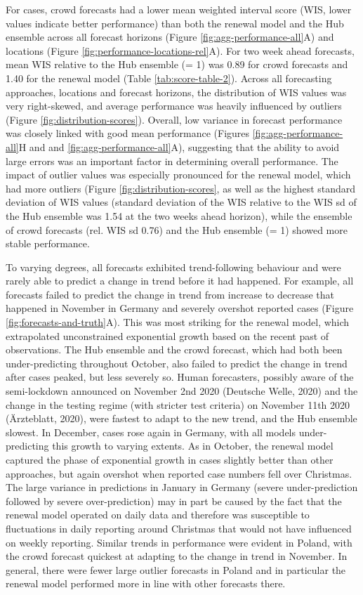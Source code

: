 \documentclass[
]{article}
\begin{document}
For cases, crowd forecasts had a lower mean weighted interval score (WIS, lower values indicate better performance) than both the renewal model and the Hub ensemble across all forecast horizons (Figure \ref{fig:agg-performance-all}A) and locations (Figure \ref{fig:performance-locations-rel}A). For two week ahead forecasts, mean WIS relative to the Hub ensemble (= 1) was 0.89 for crowd forecasts and 1.40 for the renewal model (Table \ref{tab:score-table-2}). Across all forecasting approaches, locations and forecast horizons, the distribution of WIS values was very right-skewed, and average performance was heavily influenced by outliers (Figure \ref{fig:distribution-scores}). Overall, low variance in forecast performance was closely linked with good mean performance (Figures \ref{fig:agg-performance-all}H and and \ref{fig:agg-performance-all}A), suggesting that the ability to avoid large errors was an important factor in determining overall performance. The impact of outlier values was especially pronounced for the renewal model, which had more outliers (Figure \ref{fig:distribution-scores}, as well as the highest standard deviation of WIS values (standard deviation of the WIS relative to the WIS sd of the Hub ensemble was 1.54 at the two weeks ahead horizon), while the ensemble of crowd forecasts (rel. WIS sd 0.76) and the Hub ensemble (= 1) showed more stable performance.

To varying degrees, all forecasts exhibited trend-following behaviour and were rarely able to predict a change in trend before it had happened. For example, all forecasts failed to predict the change in trend from increase to decrease that happened in November in Germany and severely overshot reported cases (Figure \ref{fig:forecasts-and-truth}A). This was most striking for the renewal model, which extrapolated unconstrained exponential growth based on the recent past of observations. The Hub ensemble and the crowd forecast, which had both been under-predicting throughout October, also failed to predict the change in trend after cases peaked, but less severely so. Human forecasters, possibly aware of the semi-lockdown announced on November 2nd 2020 (Deutsche Welle, 2020) and the change in the testing regime (with stricter test criteria) on November 11th 2020 (Ärzteblatt, 2020), were fastest to adapt to the new trend, and the Hub ensemble slowest. In December, cases rose again in Germany, with all models under-predicting this growth to varying extents. As in October, the renewal model captured the phase of exponential growth in cases slightly better than other approaches, but again overshot when reported case numbers fell over Christmas. The large variance in predictions in January in Germany (severe under-prediction followed by severe over-prediction) may in part be caused by the fact that the renewal model operated on daily data and therefore was susceptible to fluctuations in daily reporting around Christmas that would not have influenced on weekly reporting. Similar trends in performance were evident in Poland, with the crowd forecast quickest at adapting to the change in trend in November. In general, there were fewer large outlier forecasts in Poland and in particular the renewal model performed more in line with other forecasts there.
\end{document}
